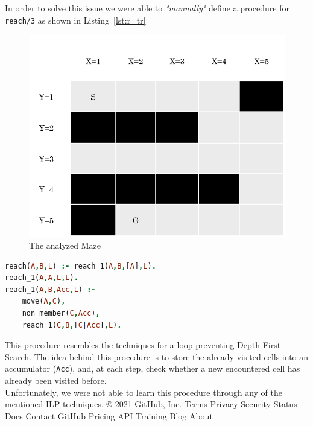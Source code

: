 In order to solve this issue we were able to \emph{"manually"} define a procedure for \texttt{reach/3} as shown in Listing~\ref{lst:r_tr}

\begin{figure}
    \centering
    \includegraphics[scale=0.7]{img/ourMaze.png}
    \caption{The analyzed Maze}\label{fig:our}
\end{figure}

\begin{lstlisting}[label={lst:r_tr}, language=Prolog, caption=\texttt{reach/3} with tail recursion, belowcaptionskip=1cm]
reach(A,B,L) :- reach_1(A,B,[A],L).
reach_1(A,A,L,L).
reach_1(A,B,Acc,L) :-
    move(A,C),
    non_member(C,Acc),
    reach_1(C,B,[C|Acc],L). 
\end{lstlisting}
This procedure resembles the techniques for a loop preventing Depth-First Search. The idea behind this procedure is to store
the already visited cells into an accumulator (\texttt{Acc}), and, at each step, check whether a new encountered cell has already
been visited before.\\
Unfortunately, we were not able to learn this procedure through any of the mentioned ILP techniques.
© 2021 GitHub, Inc.
Terms
Privacy
Security
Status
Docs
Contact GitHub
Pricing
API
Training
Blog
About
